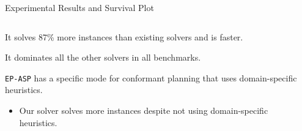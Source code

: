 \documentclass[aspectratio=169,svgnames,xcolor=table,t]{beamer}
\begin{document}
\begin{frame}{Experimental Results and Survival Plot}
    \thispagestyle{empty} 
    \begin{columns}[T]
        \begin{column}{0.45\textwidth}
            \begin{myitemize}
                \small
                \item It solves 87\% more instances than existing solvers and is  faster.

                \bigskip

                \item It dominates all the other solvers in all benchmarks.
                
                \bigskip
                
                \item \texttt{EP-ASP} has a specific mode for conformant planning that uses domain-specific heuristics.
                \begin{itemize}
                    \item Our solver solves  more instances despite not using domain-specific heuristics.
                \end{itemize}
            \end{myitemize}
        \end{column}
        \begin{column}{0.5\textwidth}
            \hspace*{-15pt}
            
        \end{column}
    \end{columns}
\end{frame}
            
\end{document}
